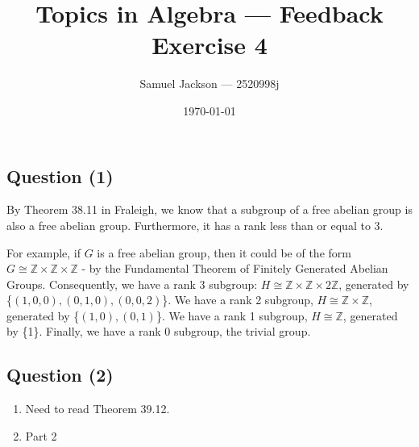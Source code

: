 \documentclass{article}
\title{Topics in Algebra  --- Feedback Exercise 4}
\author{Samuel Jackson --- 2520998j}
\date{\today}
\begin{document}
\newcommand{\order}[1]{|#1|}
\newcommand{\setS}{\mathcal{S}}
\newcommand{\norm}{\trianglelefteq}

\newcommand{\Z}{\mathbb{Z}}

\maketitle

\begin{center}
\section*{Question (1)}
\end{center}

\begin{flushleft}
	By Theorem 38.11 in Fraleigh, we know that a subgroup of a free abelian group is also a free abelian group. Furthermore, it has a rank less than or equal to 3. \newline 
	
	For example, if $G$ is a free abelian group, then it could be of the form $G \cong \Z \times \Z \times \Z$ - by the Fundamental Theorem of Finitely Generated Abelian Groups.
	Consequently, we have a rank 3 subgroup: $H \cong \Z \times \Z \times 2\Z$, generated by \{$(1,0,0), (0,1,0), (0,0,2)$\}.
	We have a rank 2 subgroup, $H \cong \Z \times \Z$, generated by \{$(1,0), (0,1)$\}.
	We have a rank 1 subgroup, $H \cong \Z$, generated by \{1\}.
	Finally, we have a rank 0 subgroup, the trivial group. 
\end{flushleft}

\begin{center}
	\section*{Question (2)}
\end{center}

\begin{enumerate}[label=\alph*)]
	\item Need to read Theorem 39.12.
	\item Part 2
\end{enumerate}
\end{document}
